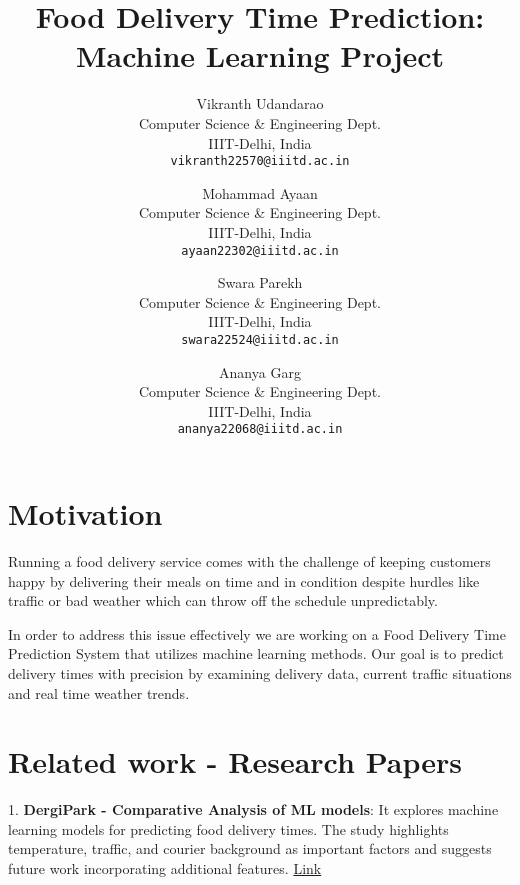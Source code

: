 \documentclass[10pt,twocolumn,letterpaper]{article}
\begin{document}
\title{Food Delivery Time Prediction: Machine Learning Project}

\author{
Vikranth Udandarao\\
Computer Science \& Engineering Dept. \\
IIIT-Delhi, India \\
{\tt\small vikranth22570@iiitd.ac.in}
\and
Mohammad Ayaan \\
Computer Science \& Engineering Dept. \\
IIIT-Delhi, India \\
{\tt\small ayaan22302@iiitd.ac.in}
\and
Swara Parekh \\
Computer Science \& Engineering Dept. \\
IIIT-Delhi, India \\
{\tt\small swara22524@iiitd.ac.in}
\and
Ananya Garg \\
Computer Science \& Engineering Dept. \\
IIIT-Delhi, India \\
{\tt\small ananya22068@iiitd.ac.in}
}

\maketitle


\section{Motivation}
Running a food delivery service comes with the challenge of keeping customers happy by delivering their meals on time and in condition despite hurdles like traffic or bad weather which can throw off the schedule unpredictably.

In order to address this issue effectively we are working on a Food Delivery Time Prediction System that utilizes machine learning methods. Our goal is to predict delivery times with precision by examining delivery data, current traffic situations and real time weather trends.

\section{Related work - Research Papers}
1. \textbf{DergiPark - Comparative Analysis of ML models}: It explores machine learning models for predicting food delivery times. The study highlights temperature, traffic, and courier background as important factors and suggests future work incorporating additional features.
\textcolor{blue}{\href{https://dergipark.org.tr/en/pub/aita/issue/84471/1459560}{Link}}
\end{document}
